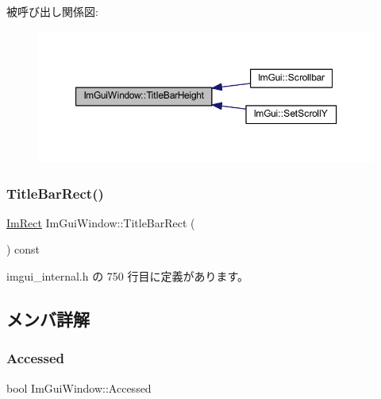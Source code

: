被呼び出し関係図\+:\nopagebreak
\begin{figure}[H]
\begin{center}
\leavevmode
\includegraphics[width=350pt]{struct_im_gui_window_ad1580cc8b5bdf981c6ed2eb22ecd7dbb_icgraph}
\end{center}
\end{figure}
\mbox{\label{struct_im_gui_window_a06884e1bc80e460e51e1626b5b976196}} 
\subsubsection{\texorpdfstring{Title\+Bar\+Rect()}{TitleBarRect()}}
{\footnotesize\ttfamily \mbox{\hyperlink{struct_im_rect}{Im\+Rect}} Im\+Gui\+Window\+::\+Title\+Bar\+Rect (\begin{DoxyParamCaption}{ }\end{DoxyParamCaption}) const\hspace{0.3cm}{\ttfamily [inline]}}



 imgui\+\_\+internal.\+h の 750 行目に定義があります。



\subsection{メンバ詳解}
\mbox{\label{struct_im_gui_window_ae57daacbc89e06bca5bc335dbca3ad15}} 
\subsubsection{\texorpdfstring{Accessed}{Accessed}}
{\footnotesize\ttfamily bool Im\+Gui\+Window\+::\+Accessed}



